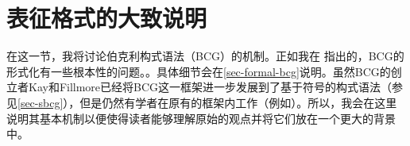 
\section{表征格式的大致说明}

在这一节，我将讨论伯克利构式语法（BCG）的机制。正如我在 指出的，BCG的形式化有一些根本性的问题。。具体细节会在\ref{sec-formal-bcg}说明。虽然BCG的创立者Kay和Fillmore已经将BCG这一框架进一步发展到了基于符号的构式语法（参见\ref{sec-sbcg}），但是仍然有学者在原有的框架内工作（例如\citealp{Fried2013a-u}）。所以，我会在这里说明其基本机制以便使得读者能够理解原始的观点并将它们放在一个更大的背景中。

